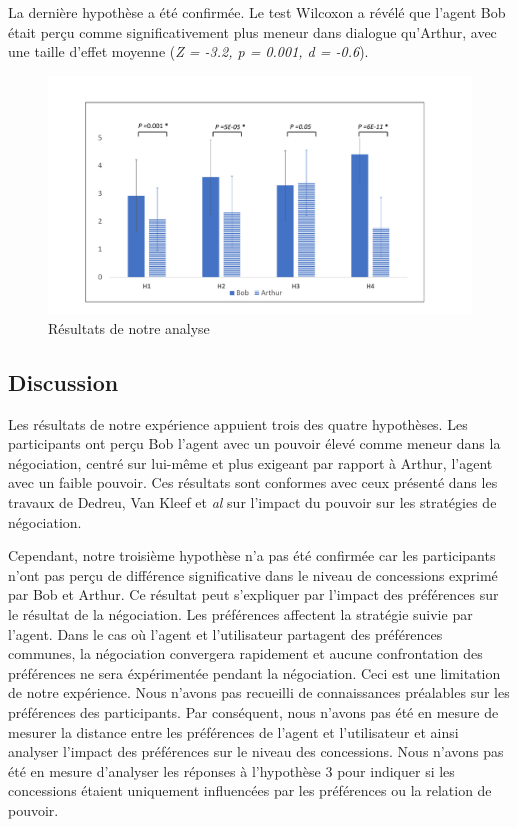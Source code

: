 \documentclass [french]{sig-alternate-05-2015}
\begin{document}
{				La dernière hypothèse a été confirmée. Le test Wilcoxon a révélé que l'agent Bob était perçu comme significativement plus meneur dans dialogue qu'Arthur, avec une taille d'effet moyenne (\emph {Z = -3.2, p = 0.001, d = -0.6}).
				
			
				\begin{figure}[t]
					\centering
					\includegraphics[width=\textwidth,height=0.3\textheight]{graphs/res.pdf}
					\caption{Résultats de notre analyse}
					\label{res}
				\end{figure}
			
			\subsection{Discussion}
			
			Les résultats de notre expérience appuient trois des quatre hypothèses. Les participants ont perçu Bob l'agent avec un pouvoir élevé comme meneur dans la négociation, centré sur lui-même et plus exigeant par rapport à Arthur, l'agent avec un faible pouvoir. Ces résultats sont conformes avec ceux présenté dans les travaux de Dedreu, Van Kleef et \emph{al} \cite {de1995impact, de2004influence, de2004influence} sur l'impact du pouvoir sur les stratégies de négociation.
			
			Cependant, notre troisième hypothèse n'a pas été confirmée car les participants n'ont pas perçu de différence significative dans le niveau de concessions exprimé par Bob et Arthur. Ce résultat peut s'expliquer par l'impact des préférences sur le résultat de la négociation. Les préférences affectent la stratégie suivie par l'agent. Dans le cas où l'agent et l'utilisateur partagent des préférences communes, la négociation convergera rapidement et aucune confrontation des préférences ne sera éxpérimentée pendant la négociation. Ceci est une limitation de notre expérience. Nous n'avons pas recueilli de connaissances préalables sur les préférences des participants. Par conséquent, nous n'avons pas été en mesure de mesurer la distance entre les préférences de l'agent et l'utilisateur et ainsi analyser l'impact des préférences sur le niveau des concessions.
			Nous n'avons pas été en mesure d'analyser les réponses à l'hypothèse 3 pour indiquer si les concessions étaient uniquement influencées par les préférences ou la relation de pouvoir.
			
}
\end{document}
